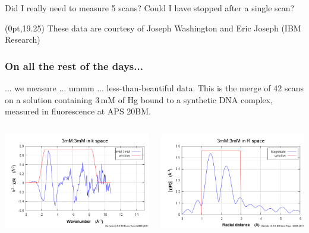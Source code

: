 \documentclass[10pt, xcolor=x11names, compress]{beamer}
\begin{document}
\begin{frame}
  ~\\[-7ex]
  ~

  \begin{exampleblock}{}
    \begin{center}
      Did I really need to measure 5 scans?  Could I have stopped
      after a single scan?
    \end{center}
  \end{exampleblock}
  \begin{textblock*}{0.4\linewidth}(0pt,19.25\TPVertModule)%
    \tiny%
    These data are courtesy of Joseph Washington and Eric
    Joseph (IBM Research)
  \end{textblock*}
\end{frame}

\begin{frame}
  \frametitle{On all the rest of the days...}
  \small%
  ... we measure ... ummm ... less-than-beautiful data.  This is the
  merge of 42 scans on a solution containing 3\,mM of Hg bound to a
  synthetic DNA complex, measured in fluorescence at APS 20BM.
  \begin{columns}
    \begin{column}{0.5\linewidth}
      \begin{center}
        \includegraphics[width=0.8\linewidth]{../ATEA/info/hgdna_chik.png}
      \end{center}
    \end{column}
    \begin{column}{0.5\linewidth}
      \begin{center}
        \includegraphics[width=0.8\linewidth]{../ATEA/info/hgdna_chir.png}

\end{center}
\end{column}
\end{columns}
\end{frame}
\end{document}
